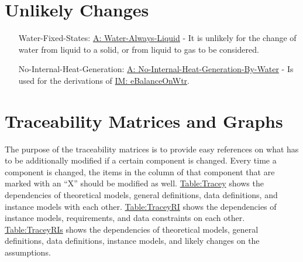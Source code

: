 \documentclass[12pt]{article}
\begin{document}
\section{Unlikely Changes}
\label{Sec:UCs}
\begin{itemize}
\item[Water-Fixed-States:\phantomsection\label{unlikeChgWFS}]\hyperref[A:Water-Always-Liquid]{A: Water-Always-Liquid} - It is unlikely for the change of water from liquid to a solid, or from liquid to gas to be considered.
\item[No-Internal-Heat-Generation:\phantomsection\label{unlikeChgNIHG}]\hyperref[A:No-Internal-Heat-Generation-By-Water]{A: No-Internal-Heat-Generation-By-Water} - Is used for the derivations of \hyperref[IM:eBalanceOnWtr]{IM: eBalanceOnWtr}.
\end{itemize}
\section{Traceability Matrices and Graphs}
\label{Sec:TraceMatrices}
The purpose of the traceability matrices is to provide easy references on what has to be additionally modified if a certain component is changed. Every time a component is changed, the items in the column of that component that are marked with an ``X'' should be modified as well. \hyperref[Table:Tracey]{Table:Tracey} shows the dependencies of theoretical models, general definitions, data definitions, and instance models with each other. \hyperref[Table:TraceyRI]{Table:TraceyRI} shows the dependencies of instance models, requirements, and data constraints on each other. \hyperref[Table:TraceyRIs]{Table:TraceyRIs} shows the dependencies of theoretical models, general definitions, data definitions, instance models, and likely changes on the assumptions.
\end{document}
